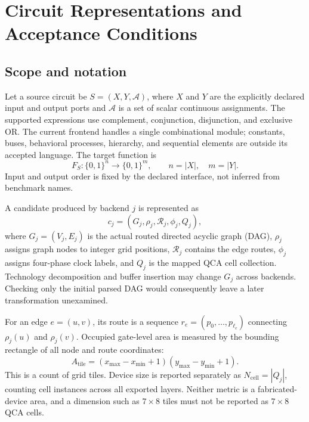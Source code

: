\documentclass[ASNA,twocolumn]{USG}
\begin{document}
\section{Circuit Representations and Acceptance Conditions}\label{sec:conditions}
\subsection{Scope and notation}
Let a source circuit be $S=(X,Y,\mathcal A)$, where $X$ and $Y$ are the explicitly declared input and output ports and $\mathcal A$ is a set of scalar continuous assignments. The supported expressions use complement, conjunction, disjunction, and exclusive OR. The current frontend handles a single combinational module; constants, buses, behavioral processes, hierarchy, and sequential elements are outside its accepted language. The target function is
\begin{equation}
F_S:\{0,1\}^{n}\longrightarrow\{0,1\}^{m},
\qquad n=|X|,\quad m=|Y|.
\end{equation}
Input and output order is fixed by the declared interface, not inferred from benchmark names.

A candidate produced by backend $j$ is represented as
\begin{equation}
c_j=(G_j,\rho_j,\mathcal R_j,\phi_j,Q_j),
\end{equation}
where $G_j=(V_j,E_j)$ is the actual routed directed acyclic graph (DAG), $\rho_j$ assigns graph nodes to integer grid positions, $\mathcal R_j$ contains the edge routes, $\phi_j$ assigns four-phase clock labels, and $Q_j$ is the mapped QCA cell collection. Technology decomposition and buffer insertion may change $G_j$ across backends. Checking only the initial parsed DAG would consequently leave a later transformation unexamined.

For an edge $e=(u,v)$, its route is a sequence $r_e=(p_0,\ldots,p_{\ell_e})$ connecting $\rho_j(u)$ and $\rho_j(v)$. Occupied gate-level area is measured by the bounding rectangle of all node and route coordinates:
\begin{equation}\label{eq:area}
A_{\mathrm{tile}}=(x_{\max}-x_{\min}+1)(y_{\max}-y_{\min}+1).
\end{equation}
This is a count of grid tiles. Device size is reported separately as $N_{\mathrm{cell}}=|Q_j|$, counting cell instances across all exported layers. Neither metric is a fabricated-device area, and a dimension such as $7\times8$ tiles must not be reported as $7\times8$ QCA cells.
\end{document}
